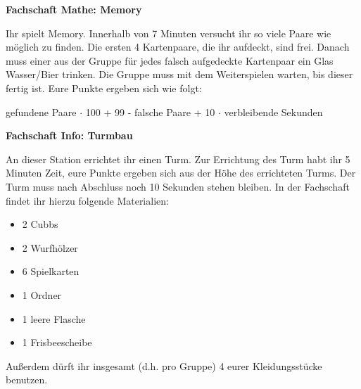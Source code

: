 \documentclass[a4paper,10pt]{article}
\begin{document}
\begin{center}
{\Huge \textbf{Fachschaft Mathe: Memory}}
\end{center}
\vspace{2cm}
{\LARGE
Ihr spielt Memory. Innerhalb von 7 Minuten versucht ihr so viele Paare wie möglich zu finden. Die ersten 4 Kartenpaare, die ihr aufdeckt, sind frei. Danach muss einer aus der Gruppe für jedes falsch aufgedeckte Kartenpaar ein Glas Wasser/Bier trinken. Die Gruppe muss mit dem Weiterspielen warten, bis dieser fertig ist.
Eure Punkte ergeben sich wie folgt: \vspace{1cm}
    \begin{center} 

    gefundene Paare $\cdot$ 100 + 99 - falsche Paare + 10 $\cdot$ verbleibende Sekunden 
     
    \end{center}

}

\pagebreak

\begin{center}
{\Huge \textbf{Fachschaft Info: Turmbau}}
\end{center}
\vspace{2cm}
{\LARGE
An dieser Station errichtet ihr einen Turm. Zur Errichtung des Turm habt ihr 5 Minuten Zeit, eure Punkte ergeben sich aus der Höhe des errichteten Turms. Der Turm muss nach Abschluss noch 10 Sekunden stehen bleiben. In der Fachschaft findet ihr hierzu folgende Materialien:
\begin{itemize}
 \item 2 Cubbs
 \item 2 Wurfhölzer
 \item 6 Spielkarten
 \item 1 Ordner
 \item 1 leere Flasche
 \item 1 Frisbeescheibe
\end{itemize}
Außerdem dürft ihr insgesamt (d.h. pro Gruppe) 4 eurer Kleidungsstücke benutzen.
}

\pagebreak
\end{document}
